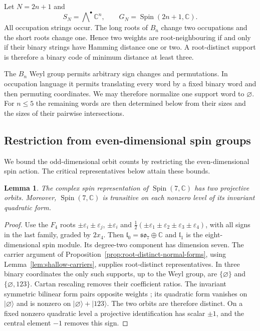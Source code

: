 \documentclass{article}
\newtheorem{lemma}[theorem]{Lemma}
\theoremstyle{definition}
\theoremstyle{remark}
\newcommand{\C}{\mathbb C}
\newcommand{\Spin}{\operatorname{Spin}}
\newcommand{\ket}[1]{\lvert #1\rangle}
\begin{document}
Let $N=2n+1$ and
\[
 S_N=\bigwedge\nolimits^\bullet\C^n,
 \qquad G_N=\Spin(2n+1,\C).
\]
All occupation strings occur.  The long roots of $B_n$ change two
occupations and the short roots change one.  Hence two weights are
root-neighbouring if and only if their binary strings have Hamming distance
one or two.  A root-distinct support is therefore a binary code of minimum
distance at least three.

The $B_n$ Weyl group permits arbitrary sign changes and permutations.  In
occupation language it permits translating every word by a fixed binary
word and then permuting coordinates.  
We may therefore normalize one support word to $\varnothing$. For
$n\le5$ the remaining words are then determined below from their sizes
and the sizes of their pairwise intersections.


\subsection{Restriction from even-dimensional spin groups}
\label{sec:odd-exhaustiveness}

We bound the odd-dimensional orbit counts by restricting the
even-dimensional spin action. The critical representatives below attain
these bounds.

\begin{lemma}
\label{lem:spin7-quadric}
The complex spin representation of $\Spin(7,\C)$ has two projective orbits. Moreover, $\Spin(7,\C)$ is transitive on each nonzero level of its invariant quadratic form.
\end{lemma}

\begin{proof}
Use the $F_4$ roots
$\pm\varepsilon_i\pm\varepsilon_j$, $\pm\varepsilon_i$ and
$\frac12(\pm\varepsilon_1\pm\varepsilon_2\pm\varepsilon_3
\pm\varepsilon_4)$, with all signs in the last family, graded by
$2x_4$. Then $\mathfrak l_0=\mathfrak{so}_7\oplus\C$ and
$\mathfrak l_1$ is the eight-dimensional spin module. Its degree-two
component has dimension seven. The carrier argument of
Proposition~\ref{prop:root-distinct-normal-forms}, using
Lemma~\ref{lem:shallow-carriers}, supplies root-distinct representatives.
In three binary coordinates the only such supports, up to the Weyl group,
are $\{\varnothing\}$ and $\{\varnothing,123\}$.
Cartan rescaling removes their coefficient ratios.
The invariant symmetric bilinear form pairs opposite weights
\cite{Chevalley1954}; its quadratic form vanishes on $\ket\varnothing$
and is nonzero on $\ket\varnothing+\ket{123}$. The two orbits are
therefore distinct. On a fixed nonzero quadratic level a projective
identification has scalar $\pm1$, and the central element $-1$ removes
this sign.
\end{proof}
\end{document}

